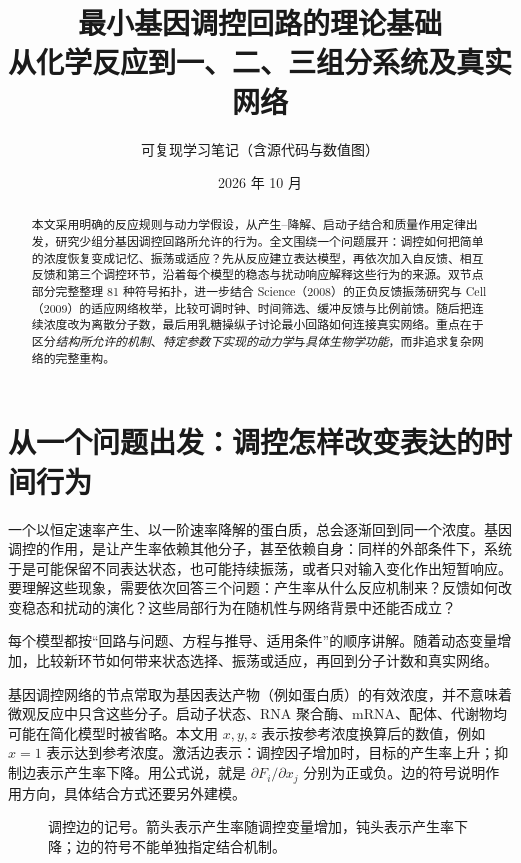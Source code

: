 \documentclass[11pt,a4paper,UTF8,fontset=fandol]{ctexart}
\title{\bfseries 最小基因调控回路的理论基础\\[4pt]\large 从化学反应到一、二、三组分系统及真实网络}
\author{可复现学习笔记（含源代码与数值图）}
\date{2026 年 10 月}
\begin{document}
\maketitle
\begin{abstract}
本文采用明确的反应规则与动力学假设，从产生--降解、启动子结合和质量作用定律出发，研究少组分基因调控回路所允许的行为。全文围绕一个问题展开：调控如何把简单的浓度恢复变成记忆、振荡或适应？先从反应建立表达模型，再依次加入自反馈、相互反馈和第三个调控环节，沿着每个模型的稳态与扰动响应解释这些行为的来源。双节点部分完整整理 81 种符号拓扑，进一步结合 Science（2008）的正负反馈振荡研究与 Cell（2009）的适应网络枚举，比较可调时钟、时间筛选、缓冲反馈与比例前馈。随后把连续浓度改为离散分子数，最后用乳糖操纵子讨论最小回路如何连接真实网络。重点在于区分\emph{结构所允许的机制}、\emph{特定参数下实现的动力学}与\emph{具体生物学功能}，而非追求复杂网络的完整重构。
\end{abstract}
\newpage{\footnotesize\linespread{.93}\selectfont\setlength{\parskip}{0pt}\tableofcontents}\newpage
\section{从一个问题出发：调控怎样改变表达的时间行为}
一个以恒定速率产生、以一阶速率降解的蛋白质，总会逐渐回到同一个浓度。基因调控的作用，是让产生率依赖其他分子，甚至依赖自身：同样的外部条件下，系统于是可能保留不同表达状态，也可能持续振荡，或者只对输入变化作出短暂响应。要理解这些现象，需要依次回答三个问题：产生率从什么反应机制来？反馈如何改变稳态和扰动的演化？这些局部行为在随机性与网络背景中还能否成立？

每个模型都按“回路与问题、方程与推导、适用条件”的顺序讲解。随着动态变量增加，比较新环节如何带来状态选择、振荡或适应，再回到分子计数和真实网络。

基因调控网络的节点常取为基因表达产物（例如蛋白质）的有效浓度，并不意味着微观反应中只含这些分子。启动子状态、RNA 聚合酶、mRNA、配体、代谢物均可能在简化模型时被省略。本文用 $x,y,z$ 表示按参考浓度换算后的数值，例如 $x=1$ 表示达到参考浓度。激活边表示：调控因子增加时，目标的产生率上升；抑制边表示产生率下降。用公式说，就是 $\partial F_i/\partial x_j$ 分别为正或负。边的符号说明作用方向，具体结合方式还要另外建模。

\begin{figure}[H]\centering
{}
\caption{调控边的记号。箭头表示产生率随调控变量增加，钝头表示产生率下降；边的符号不能单独指定结合机制。}\label{fig:signs}
\end{figure}
\end{document}
